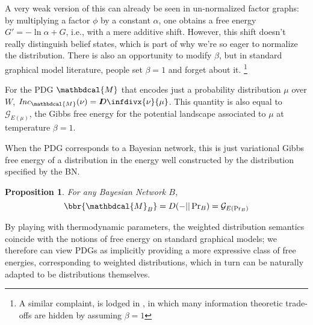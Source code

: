 \documentclass[letterpaper]{article} %
\theoremstyle{plain}
\newtheorem{prop}[theorem]{Proposition}
\theoremstyle{definition}
\theoremstyle{remark}
\newcommand{\thickD}{I\mkern-8muD}
\newcommand{\kldiv}{\thickD\infdivx}
\newcommand{\dg}[1]{\mathbdcal{#1}}
\newcommand\Inc{\mathit{Inc}}
\newcommand{\PDGof}[1]{{\dg M}_{#1}}
\begin{document}
A very weak version of this can already be seen in un-normalized factor graphs: by multiplying a factor $\phi$ by a constant $\alpha$, one obtains a free energy $G' = - \ln \alpha + G$, i.e., with a mere additive shift. However, this shift doesn't really distinguish belief states, which is part of why we're so eager to normalize the distribution.
There is also an opportunity to modify $\beta$, but in standard graphical model literature, people set $\beta = 1$ and forget about it.%
	\footnote{A similar complaint, is lodged in \cite{fixing-broken-elbo}, in which many information theoretic trade-offs are hidden by assuming $\beta = 1$}


\begin{example}%
	\label{ex:energy-from-distrib}
	For the PDG $\dg M$ that encodes just a probability
			distribution $\mu$ over $W$,  $\Inc_{\dg M}(\nu) = \kldiv{\nu}{\mu}$. This quantity is also equal to $\mathcal G_{E(\mu)}$, the Gibbs free energy for the potential landscape associated to $\mu$ at temperature $\beta = 1$.
\end{example}


When the PDG corresponds to a Bayesian network, this is just variational Gibbs free energy of a distribution in the energy well constructed by the distribution specified by the BN.

\begin{prop}\label{prop:bn-free-energy}
	For any Bayesian Network $B$, 
	\[ \bbr{\PDGof{B}} = D(- || \Pr\nolimits_B) = \mathcal G_{E(\Pr_B)} \]
\end{prop}

By playing with thermodynamic parameters, the weighted distribution semantics coincide with the notions of free energy on standard graphical models; we therefore can view PDGs as implicitly providing a more expressive class of free energies, corresponding to weighted distributions, which in turn can be naturally adapted to be distributions themselves.

\end{document}
